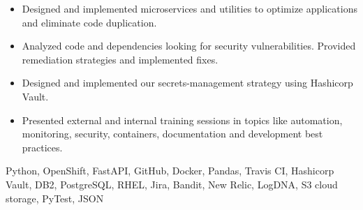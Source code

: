 \begin{experiences}
{\begin{itemize}
                \item Designed and implemented microservices and utilities to optimize 
                    applications and eliminate code duplication.
                \item Analyzed code and dependencies looking for security vulnerabilities.
                    Provided remediation strategies and implemented fixes.
                \item Designed and implemented our secrets-management strategy 
                    using Hashicorp Vault.
				\item Presented external and internal training sessions in 
                    topics like automation, monitoring, security, containers, documentation 
                    and development best practices.
            \end{itemize}
        }
        {
            Python,
            OpenShift,
            FastAPI,
            GitHub,
            Docker,
            Pandas,
            Travis CI,
            Hashicorp Vault,
            DB2,
            PostgreSQL,
            RHEL,
            Jira,
            Bandit,
            New Relic,
            LogDNA,
            S3 cloud storage,
            PyTest,
            JSON
        }


\end{experiences}
